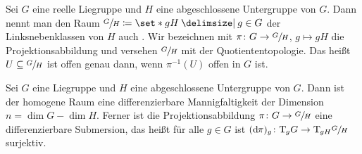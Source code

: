 \begin{definition}[{name=[homogener Raum]}]
	Sei $G$ eine reelle Liegruppe und $H$ eine abgeschlossene Untergruppe von $G$.
	Dann nennt man den Raum $\sfrac{G}{H} \coloneqq \set*{g H \given g \in G}$ der Linksnebenklassen von $H$ auch . 
	Wir bezeichnen mit $\pi \colon G \to \sfrac{G}{H}$, $g \mapsto gH$ die Projektionsabbildung und versehen $\sfrac{G}{H}$ mit der Quotiententopologie.
	Das heißt $U \subseteq \sfrac{G}{H}$ ist offen genau dann, wenn $\pi^{-1}(U)$ offen in $G$ ist.
\end{definition}

\begin{satz}[{name=[homogener Raum ist differenzierbare Mannigfaltigkeit]},label=satz:312]
	Sei $G$ eine Liegruppe und $H$ eine abgeschlossene Untergruppe von $G$.
	Dann ist der homogene Raum eine differenzierbare Mannigfaltigkeit der Dimension $n = \dim G - \dim H$.
	Ferner ist die Projektionsabbildung $\pi \colon G \to \sfrac{G}{H}$ eine differenzierbare Submersion, das heißt für alle $g \in G$ ist $(\mathrm{d}\mkern-1.0mu \pi)_g \colon \mathrm{T}\mkern-0.85mu_g G \to \mathrm{T}\mkern-0.85mu_{gH} \sfrac{G}{H}$ surjektiv.
\end{satz}
